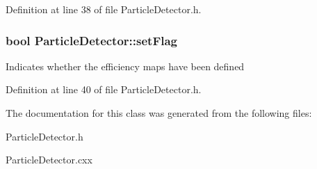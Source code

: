Definition at line 38 of file Particle\-Detector.\-h.

\hypertarget{classParticleDetector_a52a6f3a2af63e5d5b8cd61b53a47e944}{
\subsubsection[{set\-Flag}]{\setlength{\rightskip}{0pt plus 5cm}bool Particle\-Detector\-::set\-Flag\hspace{0.3cm}{\ttfamily [protected]}}}\label{classParticleDetector_a52a6f3a2af63e5d5b8cd61b53a47e944}
Indicates whether the efficiency maps have been defined 

Definition at line 40 of file Particle\-Detector.\-h.



The documentation for this class was generated from the following files\-:\begin{DoxyCompactItemize}
\item 
Particle\-Detector.\-h\item 
Particle\-Detector.\-cxx\end{DoxyCompactItemize}
